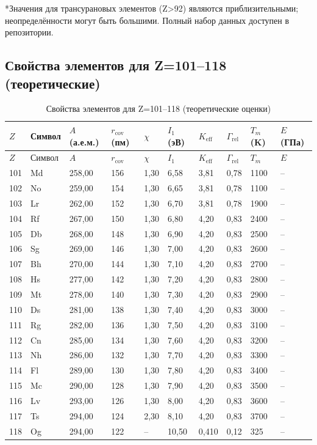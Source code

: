 \documentclass[12pt,a4paper]{article}
\newcommand{\Keff}{K_{\mathrm{eff}}}
\begin{document}
	*Значения для трансурановых элементов (Z>92) являются приблизительными; неопределённости могут быть большими. Полный набор данных доступен в репозитории.
	
	\subsection*{Свойства элементов для Z=101–118 (теоретические)}
	
	\begin{longtable}{p{0.6cm}p{1.2cm}p{1.2cm}p{1.2cm}p{1.2cm}p{1.2cm}p{1.5cm}p{1.2cm}p{1.2cm}p{1.2cm}}
		\caption{Свойства элементов для Z=101–118 (теоретические оценки)} \label{tab:elem-data-101to118} \\
		\toprule
		\(Z\) & Символ & \(A\) (а.е.м.) & \(r_{\text{cov}}\) (пм) & \(\chi\) & \(I_1\) (эВ) & \(\Keff\) & \(\Gamma_{\text{rel}}\) & \(T_m\) (K) & \(E\) (ГПа) \\
		\midrule
		\endfirsthead
		\toprule
		\(Z\) & Символ & \(A\) & \(r_{\text{cov}}\) & \(\chi\) & \(I_1\) & \(\Keff\) & \(\Gamma_{\text{rel}}\) & \(T_m\) & \(E\) \\
		\midrule
		\endhead
		101 & Md & 258,00 & 156 & 1,30 & 6,58 & 3,81 & 0,78 & 1100 & – \\
		102 & No & 259,00 & 154 & 1,30 & 6,65 & 3,81 & 0,78 & 1100 & – \\
		103 & Lr & 262,00 & 152 & 1,30 & 6,70 & 3,81 & 0,78 & 1900 & – \\
		104 & Rf & 267,00 & 150 & 1,30 & 6,80 & 4,20 & 0,83 & 2400 & – \\
		105 & Db & 268,00 & 148 & 1,30 & 6,90 & 4,20 & 0,83 & 2500 & – \\
		106 & Sg & 269,00 & 146 & 1,30 & 7,00 & 4,20 & 0,83 & 2600 & – \\
		107 & Bh & 270,00 & 144 & 1,30 & 7,10 & 4,20 & 0,83 & 2700 & – \\
		108 & Hs & 277,00 & 142 & 1,30 & 7,20 & 4,20 & 0,83 & 2800 & – \\
		109 & Mt & 278,00 & 140 & 1,30 & 7,30 & 4,20 & 0,83 & 2900 & – \\
		110 & Ds & 281,00 & 138 & 1,30 & 7,40 & 4,20 & 0,83 & 3000 & – \\
		111 & Rg & 282,00 & 136 & 1,30 & 7,50 & 4,20 & 0,83 & 3100 & – \\
		112 & Cn & 285,00 & 134 & 1,30 & 7,60 & 4,20 & 0,83 & 3200 & – \\
		113 & Nh & 286,00 & 132 & 1,30 & 7,70 & 4,20 & 0,83 & 3300 & – \\
		114 & Fl & 289,00 & 130 & 1,30 & 7,80 & 4,20 & 0,83 & 3400 & – \\
		115 & Mc & 290,00 & 128 & 1,30 & 7,90 & 4,20 & 0,83 & 3500 & – \\
		116 & Lv & 293,00 & 126 & 1,30 & 8,00 & 4,20 & 0,83 & 3600 & – \\
		117 & Ts & 294,00 & 124 & 2,30 & 8,10 & 4,20 & 0,83 & 3700 & – \\
		118 & Og & 294,00 & 122 & –    & 10,50 & 0,410 & 0,12 & 325 & – \\
		\bottomrule
	\end{longtable}
\end{document}
